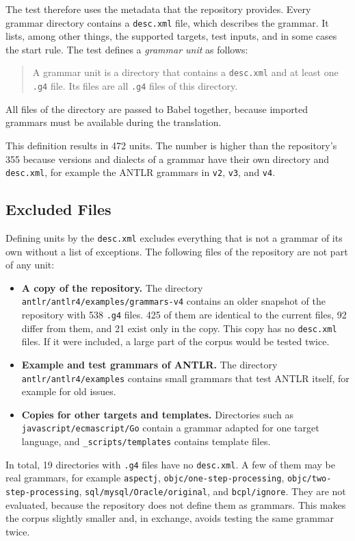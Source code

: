 \documentclass[thesis]{plai}
\begin{document}
The test therefore uses the metadata that the repository provides. Every grammar directory contains a \texttt{desc.xml} file, which describes the grammar. It lists, among other things, the supported targets, test inputs, and in some cases the start rule. The test defines a \emph{grammar unit} as follows:
\begin{quote}
A grammar unit is a directory that contains a \texttt{desc.xml} and at least one \texttt{.g4} file. Its files are all \texttt{.g4} files of this directory.
\end{quote}
All files of the directory are passed to Babel together, because imported grammars must be available during the translation.

This definition results in 472 units. The number is higher than the repository's 355 because versions and dialects of a grammar have their own directory and \texttt{desc.xml}, for example the ANTLR grammars in \texttt{v2}, \texttt{v3}, and \texttt{v4}.

\subsection{Excluded Files}
Defining units by the \texttt{desc.xml} excludes everything that is not a grammar of its own without a list of exceptions. The following files of the repository are not part of any unit:
\begin{itemize}
    \item \textbf{A copy of the repository.} The directory \texttt{antlr/\allowbreak{}antlr4/\allowbreak{}examples/\allowbreak{}grammars-v4} contains an older snapshot of the repository with 538 \texttt{.g4} files. 425 of them are identical to the current files, 92 differ from them, and 21 exist only in the copy. This copy has no \texttt{desc.xml} files. If it were included, a large part of the corpus would be tested twice.
    \item \textbf{Example and test grammars of ANTLR.} The directory \texttt{antlr/\allowbreak{}antlr4/\allowbreak{}examples} contains small grammars that test ANTLR itself, for example for old issues.
    \item \textbf{Copies for other targets and templates.} Directories such as \texttt{javascript/\allowbreak{}ecmascript/\allowbreak{}Go} contain a grammar adapted for one target language, and \texttt{\_scripts/\allowbreak{}templates} contains template files.
\end{itemize}
In total, 19 directories with \texttt{.g4} files have no \texttt{desc.xml}. A few of them may be real grammars, for example \texttt{aspectj}, \texttt{objc/\allowbreak{}one-step-processing}, \texttt{objc/\allowbreak{}two-step-processing}, \texttt{sql/\allowbreak{}mysql/\allowbreak{}Oracle/\allowbreak{}original}, and \texttt{bcpl/\allowbreak{}ignore}. They are not evaluated, because the repository does not define them as grammars. This makes the corpus slightly smaller and, in exchange, avoids testing the same grammar twice.
\end{document}
